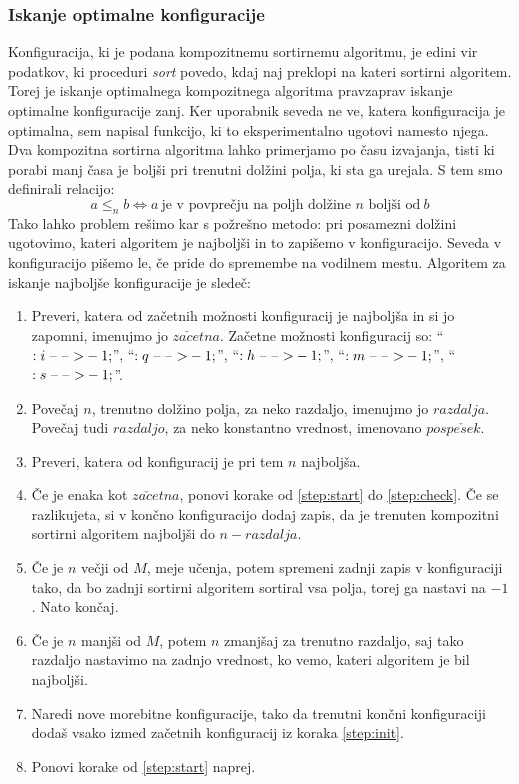 \documentclass[a4paper,oneside]{article}
\newcommand{\konfarrow}{\mbox{--}\ \mbox{--}\ \mbox{\ensuremath{>}}}
\begin{document}
\subsubsection{Iskanje optimalne konfiguracije}
Konfiguracija, ki je podana kompozitnemu sortirnemu algoritmu, je edini vir podatkov, ki
proceduri \emph{sort} povedo, kdaj naj preklopi na kateri sortirni algoritem.
Torej je iskanje optimalnega kompozitnega algoritma pravzaprav iskanje optimalne
konfiguracije zanj. Ker uporabnik seveda ne ve, katera konfiguracija je optimalna, sem
napisal funkcijo, ki to eksperimentalno ugotovi namesto njega.
Dva kompozitna sortirna algoritma lahko primerjamo po času izvajanja, tisti ki porabi manj
časa je boljši pri trenutni dolžini polja, ki sta ga urejala.
S tem smo definirali relacijo:
\[ a \leq_n b \Leftrightarrow a\ \text{je v povprečju na poljh dolžine $n$ boljši
od}\ b\]
Tako lahko problem rešimo kar s požrešno metodo: 
pri posamezni dolžini ugotovimo, kateri algoritem je najboljši in to zapišemo
v konfiguracijo. Seveda v konfiguracijo pišemo le, če pride do spremembe na vodilnem
mestu.
Algoritem za iskanje najboljše konfiguracije je sledeč:
\begin{enumerate}
  \item \label{step:init}Preveri, katera od začetnih možnosti konfiguracij je najboljša in
    si jo zapomni, imenujmo jo $za\check{c}etna$. Začetne možnosti konfiguracij so:
    ``$:i\ \konfarrow-1;$'', ``$:q\ \konfarrow-1;$'', ``$:h\ \konfarrow-1;$'',
    ``$:m\ \konfarrow-1;$'', ``$:s\ \konfarrow-1;$''.
  \item \label{step:start}Povečaj $n$, trenutno dolžino polja, za neko razdaljo, imenujmo
    jo $razdalja$. Povečaj tudi $razdaljo$, za neko konstantno vrednost, imenovano
    $pospe\check{s}ek$.
  \item Preveri, katera od konfiguracij je pri tem $n$ najboljša.
  \item \label{step:check}Če je enaka kot $za\check{c}etna$, ponovi korake od \ref{step:start} do
    \ref{step:check}. Če se razlikujeta, si v končno konfiguracijo dodaj zapis, da je
    trenuten kompozitni sortirni algoritem najboljši do $n - razdalja$.
  \item Če je $n$ večji od $M$, meje učenja, potem spremeni zadnji zapis v konfiguraciji
    tako, da bo zadnji sortirni algoritem sortiral vsa polja, torej ga nastavi na $-1$.
    Nato končaj.
  \item Če je $n$ manjši od $M$, potem $n$ zmanjšaj za trenutno razdaljo, saj
    tako razdaljo nastavimo na zadnjo vrednost, ko vemo, kateri algoritem je bil
    najboljši.
  \item Naredi nove morebitne konfiguracije, tako da trenutni končni konfiguraciji dodaš
    vsako izmed začetnih konfiguracij iz koraka \ref{step:init}.
  \item Ponovi korake od \ref{step:start} naprej.
\end{enumerate}
\end{document}
